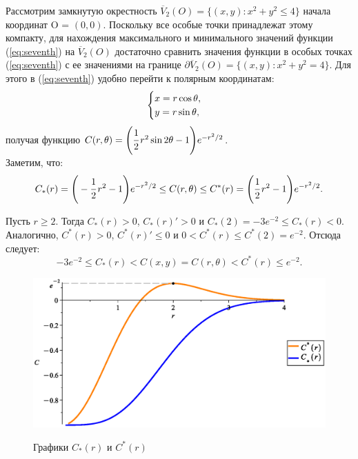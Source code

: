 \documentclass{article}
\begin{document}
Рассмотрим замкнутую окрестность $\overline{V}_2(O) = \{(x,y): x^2 + y^2 \leq 4\}$ начала координат O = $(0,0)$. Поскольку все особые точки принадлежат этому компакту, для нахождения максимального и минимального значений функции (\ref{eq:seventh}) на $\overline{V}_2(O)$ достаточно сравнить значения функции в особых точках (\ref{eq:seventh}) с ее значениями на границе $\partial \overline{V}_2(O) = \{(x,y): x^2 + y^2 = 4\}$. Для этого в (\ref{eq:seventh}) удобно перейти к полярным координатам:\smallskip
\begin{equation}
     \begin{cases}
         x = r \cos{\theta},\cr
         y = r \sin{\theta},
     \end{cases}
     \label{eq:eight}
\end{equation}
получая функцию $C(r, \theta) = \Bigg(\cfrac{1}{2}\,r^2\sin{2\theta} - 1\Bigg)e^{-r^2/2}$.\\

Заметим, что:
\begin{equation}
  C_*(r) = \Bigg(-\cfrac{1}{2}\,r^2 - 1\Bigg)e^{-r^2/2} \leq C(r, \theta) \leq C^*(r) = \Bigg(\cfrac{1}{2}\,r^2 - 1\Bigg)e^{-r^2/2}. 
  \label{eq:ninth}
\end{equation}

Пусть $r \geq 2$. Тогда $C_*(r) > 0$, $C_*(r) ' > 0$ и $C_* (2) = -3e^{-2} \leq C_* (r) < 0$. Аналогично, $C^*(r) > 0$, $C^*(r) ' \leq 0$ и $0<C^* (r)\leq C^* (2) = e^{-2} $. Отсюда следует:
$$-3e^{-2} \leq C_* (r) < C(x,y) = C(r, \theta)<C^* (r) \leq e^{-2}.$$

\begin{figure}[ht!]%
    \begin{center}
    {\includegraphics[scale=0.7]{mmrcd2.eps} }%
    \caption{Графики $C_*(r)$ и $C^*(r)$}%
    \label{fig:first}
    \end{center}%
\end{figure}
\end{document}
